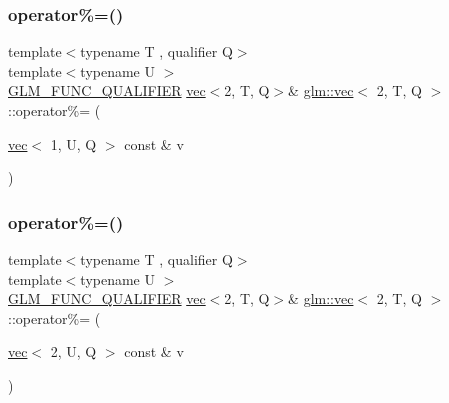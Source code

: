 \mbox{\label{structglm_1_1vec_3_012_00_01_t_00_01_q_01_4_a267102cc597898b31585143684c70530}} 
\subsubsection{\texorpdfstring{operator\%=()}{operator\%=()}\hspace{0.1cm}{\footnotesize\ttfamily [5/6]}}
{\footnotesize\ttfamily template$<$typename T , qualifier Q$>$ \\
template$<$typename U $>$ \\
\mbox{\hyperlink{setup_8hpp_a33fdea6f91c5f834105f7415e2a64407}{G\+L\+M\+\_\+\+F\+U\+N\+C\+\_\+\+Q\+U\+A\+L\+I\+F\+I\+ER}} \mbox{\hyperlink{structglm_1_1vec}{vec}}$<$2, T, Q$>$\& \mbox{\hyperlink{structglm_1_1vec}{glm\+::vec}}$<$ 2, T, Q $>$\+::operator\%= (\begin{DoxyParamCaption}\item[{\mbox{\hyperlink{structglm_1_1vec}{vec}}$<$ 1, U, Q $>$ const \&}]{v }\end{DoxyParamCaption})}

\mbox{\label{structglm_1_1vec_3_012_00_01_t_00_01_q_01_4_a28092b816bf44c13025e22c1cdf53d68}} 
\subsubsection{\texorpdfstring{operator\%=()}{operator\%=()}\hspace{0.1cm}{\footnotesize\ttfamily [6/6]}}
{\footnotesize\ttfamily template$<$typename T , qualifier Q$>$ \\
template$<$typename U $>$ \\
\mbox{\hyperlink{setup_8hpp_a33fdea6f91c5f834105f7415e2a64407}{G\+L\+M\+\_\+\+F\+U\+N\+C\+\_\+\+Q\+U\+A\+L\+I\+F\+I\+ER}} \mbox{\hyperlink{structglm_1_1vec}{vec}}$<$2, T, Q$>$\& \mbox{\hyperlink{structglm_1_1vec}{glm\+::vec}}$<$ 2, T, Q $>$\+::operator\%= (\begin{DoxyParamCaption}\item[{\mbox{\hyperlink{structglm_1_1vec}{vec}}$<$ 2, U, Q $>$ const \&}]{v }\end{DoxyParamCaption})}

